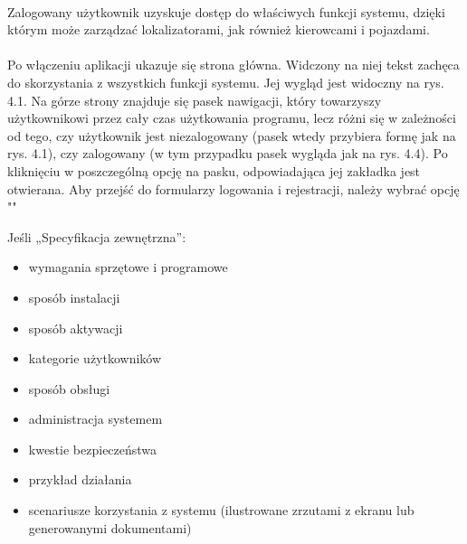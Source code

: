\paragraph{}
Zalogowany użytkownik uzyskuje dostęp do właściwych funkcji systemu, dzięki którym może zarządzać lokalizatorami, jak również kierowcami i pojazdami.

\paragraph{}
Po włączeniu aplikacji ukazuje się strona główna. Widczony na niej tekst zachęca do skorzystania z wszystkich funkcji systemu. Jej wygląd jest widoczny na rys. 4.1. Na górze strony znajduje się pasek nawigacji, który towarzyszy użytkownikowi przez cały czas użytkowania programu, lecz różni się w zależności od tego, czy użytkownik jest niezalogowany (pasek wtedy przybiera formę jak na rys. 4.1), czy zalogowany (w tym przypadku pasek wygląda jak na rys. 4.4). Po kliknięciu w poszczególną opcję na pasku, odpowiadająca jej zakładka jest otwierana. Aby przejść do formularzy logowania i rejestracji, należy wybrać opcję ""


Jeśli „Specyfikacja zewnętrzna”:
\begin{itemize}
\item  wymagania sprzętowe i programowe
\item  sposób instalacji
\item  sposób aktywacji
\item  kategorie użytkowników
\item  sposób obsługi
\item  administracja systemem
\item  kwestie bezpieczeństwa
\item  przykład działania
\item  scenariusze korzystania z systemu (ilustrowane zrzutami z ekranu lub generowanymi dokumentami)
\end{itemize}

